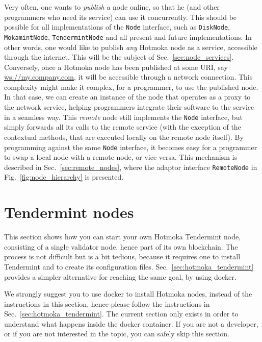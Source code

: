 \begin{description}
Very often, one wants to \emph{publish} a node online,
so that he (and other programmers who need its service) can use it concurrently.
This should be possible for all implementations of the
\texttt{Node} interface,
such as \texttt{DiskNode},
\texttt{MokamintNode},
\texttt{TendermintNode}
and all present and future implementations.
In other words, one would like to publish \emph{any}
Hotmoka node as a service, accessible through the internet. This will be the subject
of Sec.~\ref{sec:node_services}.
Conversely, once a Hotmoka node has been published at some URI, say
\url{ws://my.company.com}, it will be accessible through a network connection. This complexity
might make it complex, for a programmer, to use the published node.
In that case, we can create an instance of the node that operates as
a proxy to the network service, helping programmers integrate
their software to the service in a seamless way. This \emph{remote} node still implements
the \texttt{Node} interface, but simply forwards all its calls to the remote service
(with the exception of the contextual methods, that are executed locally on
the remote node itself). By programming against
the same \texttt{Node} interface, it becomes easy for a programmer
to swap a local node with a remote node, or vice versa. This mechanism is described
in Sec.~\ref{sec:remote_nodes},
where the adaptor interface \texttt{RemoteNode} in Fig.~\ref{fig:node_hierarchy} is presented.
\end{description}

\section{Tendermint nodes}\label{sec:tendermint_nodes}

This section shows how you can start your own Hotmoka Tendermint node,
consisting of a single validator node, hence part of its own blockchain.
The process is not difficult but is a bit tedious,
because it requires one to install Tendermint and to create
its configuration files. Sec.~\ref{sec:hotmoka_tendermint}
provides a simpler alternative for reaching the same goal, by using docker.

\begin{commentbox}
We strongly suggest you to use docker to install Hotmoka nodes, instead of the instructions
in this section, hence please
follow the instructions in Sec.~\ref{sec:hotmoka_tendermint}.
The current section only exists in order to understand what happens inside the docker container.
If you are not a developer, or if you are not interested in the topic, you can safely
skip this section.
\end{commentbox}

